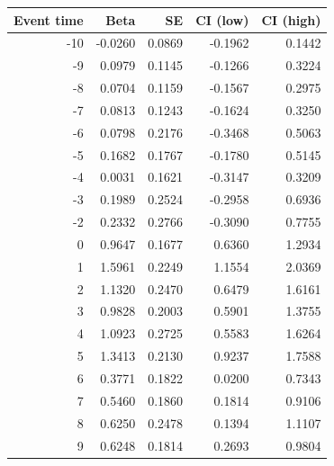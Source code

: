 \begin{tabular}{rrrrr}
\toprule
Event time & Beta & SE & CI (low) & CI (high) \\
\midrule
-10 & -0.0260 & 0.0869 & -0.1962 & 0.1442 \\
-9 & 0.0979 & 0.1145 & -0.1266 & 0.3224 \\
-8 & 0.0704 & 0.1159 & -0.1567 & 0.2975 \\
-7 & 0.0813 & 0.1243 & -0.1624 & 0.3250 \\
-6 & 0.0798 & 0.2176 & -0.3468 & 0.5063 \\
-5 & 0.1682 & 0.1767 & -0.1780 & 0.5145 \\
-4 & 0.0031 & 0.1621 & -0.3147 & 0.3209 \\
-3 & 0.1989 & 0.2524 & -0.2958 & 0.6936 \\
-2 & 0.2332 & 0.2766 & -0.3090 & 0.7755 \\
0 & 0.9647 & 0.1677 & 0.6360 & 1.2934 \\
1 & 1.5961 & 0.2249 & 1.1554 & 2.0369 \\
2 & 1.1320 & 0.2470 & 0.6479 & 1.6161 \\
3 & 0.9828 & 0.2003 & 0.5901 & 1.3755 \\
4 & 1.0923 & 0.2725 & 0.5583 & 1.6264 \\
5 & 1.3413 & 0.2130 & 0.9237 & 1.7588 \\
6 & 0.3771 & 0.1822 & 0.0200 & 0.7343 \\
7 & 0.5460 & 0.1860 & 0.1814 & 0.9106 \\
8 & 0.6250 & 0.2478 & 0.1394 & 1.1107 \\
9 & 0.6248 & 0.1814 & 0.2693 & 0.9804 \\
\bottomrule
\end{tabular}
